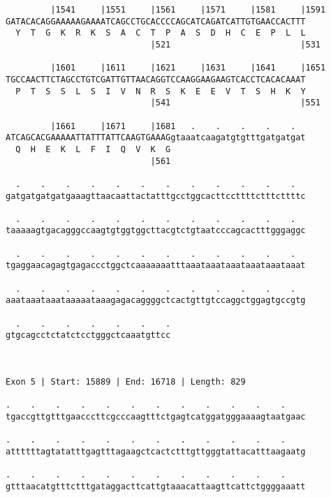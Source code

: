 \documentclass{article}
\begin{document}
\begin{Verbatim}
         |1541     |1551     |1561     |1571     |1581     |1591
GATACACAGGAAAAAGAAAATCAGCCTGCACCCCAGCATCAGATCATTGTGAACCACTTT
  Y  T  G  K  R  K  S  A  C  T  P  A  S  D  H  C  E  P  L  L
                             |521                          |531
  
         |1601     |1611     |1621     |1631     |1641     |1651
TGCCAACTTCTAGCCTGTCGATTGTTAACAGGTCCAAGGAAGAAGTCACCTCACACAAAT
  P  T  S  S  L  S  I  V  N  R  S  K  E  E  V  T  S  H  K  Y
                             |541                          |551
  
         |1661     |1671     |1681   .    .    .    .    .  
ATCAGCACGAAAAATTATTTATTCAAGTGAAAGgtaaatcaagatgtgtttgatgatgat
  Q  H  E  K  L  F  I  Q  V  K  G                           
                             |561                           
  
  .    .    .    .    .    .    .    .    .    .    .    .  
gatgatgatgatgaaagttaacaattactatttgcctggcacttccttttctttcttttc
                                                            
  .    .    .    .    .    .    .    .    .    .    .    .  
taaaaagtgacagggccaagtgtggtggcttacgtctgtaatcccagcactttgggaggc
                                                            
  .    .    .    .    .    .    .    .    .    .    .    .  
tgaggaacagagtgagaccctggctcaaaaaaatttaaataaataaataaataaataaat
                                                            
  .    .    .    .    .    .    .    .    .    .    .    .  
aaataaataaataaaaataaagagacaggggctcactgttgtccaggctggagtgccgtg
                                                            
  .    .    .    .    .    .    .
gtgcagcctctatctcctgggctcaaatgttcc
                                 
                                 
 
Exon 5 | Start: 15889 | End: 16718 | Length: 829
 
.    .    .    .    .    .    .    .    .    .    .    .    
tgaccgttgtttgaacccttcgcccaagtttctgagtcatggatgggaaaagtaatgaac
                                                            
.    .    .    .    .    .    .    .    .    .    .    .    
attttttagtatatttgagtttagaagctcactctttgttgggtattacatttaagaatg
                                                            
.    .    .    .    .    .    .    .    .    .    .    .    
gtttaacatgtttctttgataggacttcattgtaaacattaagttcattctggggaaatt
                                                            

\end{Verbatim}
\end{document}
